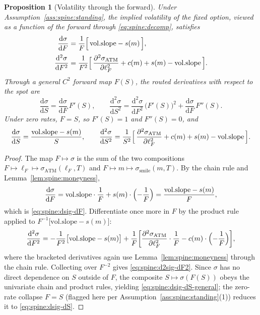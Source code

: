 \documentclass[11pt]{book}
\theoremstyle{plain}
\newtheorem{proposition}[theorem]{Proposition}
\theoremstyle{definition}
\theoremstyle{remark}
\newcommand{\mln}{m}                             %
\newcommand{\lF}{\ell_F}                         %
\newcommand{\ssm}{\sigma_{\mathrm{smile}}}       %
\newcommand{\satm}{\sigma_{\mathrm{ATM}}}        %
\newcommand{\volslope}{\mathrm{vol.slope}}       %
\newcommand{\dd}{\mathrm{d}}                                  %
\newcommand{\pdd}[2]{\frac{\partial^2 #1}{\partial #2^2}}     %
\newcommand{\td}[2]{\frac{\dd #1}{\dd #2}}                    %
\begin{document}
\begin{proposition}[Volatility through the forward]\label{prop:spine:vol-through-F}
Under Assumption~\ref{ass:spine:standing}, the implied volatility of the fixed
option, viewed as a function of the forward through
\eqref{eq:spine:decomp}, satisfies
\begin{align}
  \td{\sigma}{F}
  &= \frac{1}{F}\Bigl[\,\volslope - s(\mln)\,\Bigr],
    \label{eq:spine:dsig-dF}\\[2pt]
  \frac{\dd^2 \sigma}{\dd F^2}
  &= \frac{1}{F^2}\Bigl[\,\pdd{\satm}{\lF} + c(\mln) + s(\mln) - \volslope\,\Bigr].
    \label{eq:spine:d2sig-dF2}
\end{align}
Through a general $C^2$ forward map $F(S)$, the routed derivatives with
respect to the spot are
\begin{equation}\label{eq:spine:dsig-dS-general}
  \td{\sigma}{S} = \td{\sigma}{F}\,F'(S), \qquad
  \frac{\dd^2 \sigma}{\dd S^2}
  = \frac{\dd^2 \sigma}{\dd F^2}\,\bigl(F'(S)\bigr)^2
  + \td{\sigma}{F}\,F''(S).
\end{equation}
Under zero rates, $F = S$, so $F'(S) = 1$ and $F''(S) = 0$, and
\begin{equation}\label{eq:spine:dsig-dS}
  \td{\sigma}{S} = \frac{\volslope - s(\mln)}{S},
  \qquad
  \frac{\dd^2 \sigma}{\dd S^2}
  = \frac{1}{S^2}\Bigl[\,\pdd{\satm}{\lF} + c(\mln) + s(\mln) - \volslope\,\Bigr].
\end{equation}
\end{proposition}

\begin{proof}
The map $F \mapsto \sigma$ is the sum of the two compositions
$F \mapsto \lF \mapsto \satm(\lF, T)$ and $F \mapsto \mln \mapsto \ssm(\mln, T)$.
By the chain rule and Lemma~\ref{lem:spine:moneyness},
\[
  \td{\sigma}{F}
  = \volslope \cdot \frac{1}{F} + s(\mln)\cdot\Bigl(-\frac{1}{F}\Bigr)
  = \frac{\volslope - s(\mln)}{F},
\]
which is \eqref{eq:spine:dsig-dF}. Differentiate once more in $F$ by the
product rule applied to $F^{-1}\bigl[\volslope - s(\mln)\bigr]$:
\[
  \frac{\dd^2 \sigma}{\dd F^2}
  = -\frac{1}{F^2}\bigl[\volslope - s(\mln)\bigr]
    + \frac{1}{F}\biggl[\pdd{\satm}{\lF}\cdot\frac{1}{F}
      - c(\mln)\cdot\Bigl(-\frac{1}{F}\Bigr)\biggr],
\]
where the bracketed derivatives again use Lemma~\ref{lem:spine:moneyness}
through the chain rule. Collecting over $F^{-2}$ gives
\eqref{eq:spine:d2sig-dF2}. Since $\sigma$ has no direct dependence on $S$
outside of $F$, the composite $S \mapsto \sigma(F(S))$ obeys the univariate
chain and product rules, yielding \eqref{eq:spine:dsig-dS-general}; the
zero-rate collapse $F = S$ (flagged here per
Assumption~\ref{ass:spine:standing}(1)) reduces it to
\eqref{eq:spine:dsig-dS}.
\end{proof}
\end{document}
